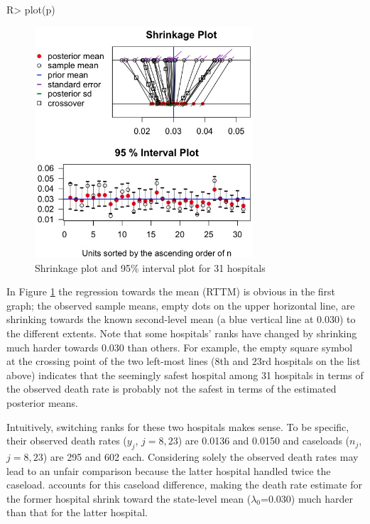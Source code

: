 \documentclass[article]{jss}
\begin{document}
\begin{CodeChunk}
\begin{CodeInput}
R> plot(p)
\end{CodeInput}
\end{CodeChunk}
\begin{figure}[h]
\begin{center}
\includegraphics[width = 3.2in]{hospital1.png}
\caption{Shrinkage plot and 95\% interval plot for 31 hospitals}
\label{fig:hospshr}
\end{center}
\end{figure}

In Figure \ref{fig:hospshr} the regression towards the mean (RTTM) is obvious in the first graph; the observed sample means, empty dots on the upper horizontal line, are shrinking towards the known second-level mean (a blue vertical line at 0.030) to the different extents. Note that some hospitals' ranks have changed by shrinking much harder towards 0.030 than others. For example, the empty square symbol at the crossing point of the two left-most lines (8th and 23rd hospitals on the list above) indicates that  the seemingly safest hospital among 31 hospitals in terms of the observed death rate is probably not the safest in terms of the estimated posterior means. 


Intuitively, switching ranks for these two hospitals makes sense. To be specific, their observed death rates ($y_{j}$, $j=8, 23$) are 0.0136 and 0.0150 and caseloads ($n_{j}$, $j=8, 23$) are 295 and 602 each. Considering solely the observed death rates may lead to an unfair comparison because the latter hospital handled twice the caseload.  accounts for this caseload difference, making the death rate estimate for the former hospital shrink toward the state-level mean ($\lambda_{0}$=0.030) much harder than that for the latter hospital.
\end{document}
